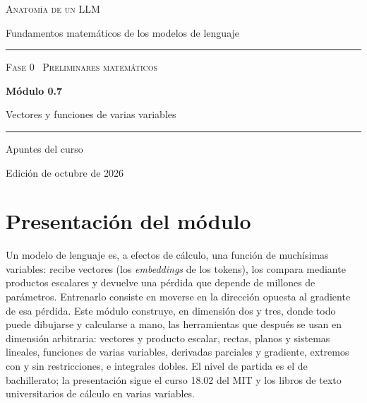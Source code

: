 \documentclass[11pt,a4paper,twoside,openany]{book}
\begin{document}
\frontmatter
\begin{titlepage}
\centering
\vspace*{2.5cm}
{\large\scshape Anatomía de un LLM}\par
\vspace{0.4cm}
{\normalsize Fundamentos matemáticos de los modelos de lenguaje}\par
\vspace{2.2cm}
\rule{\textwidth}{0.8pt}\par\vspace{0.5cm}
{\small\scshape Fase 0 \textperiodcentered\ Preliminares matemáticos}\par\vspace{0.3cm}
{\Huge\bfseries Módulo 0.7\par}\vspace{0.3cm}
{\LARGE Vectores y funciones de varias variables\par}
\vspace{0.5cm}\rule{\textwidth}{0.4pt}\par
\vspace{1.6cm}
{\large Apuntes del curso}\par
\vfill
{\small Edición de octubre de 2026}\par
\end{titlepage}

\chapter*{Presentación del módulo}

Un modelo de lenguaje es, a efectos de cálculo, una función de muchísimas variables: recibe vectores (los \emph{embeddings} de los tokens), los compara mediante productos escalares y devuelve una pérdida que depende de millones de parámetros. Entrenarlo consiste en moverse en la dirección opuesta al gradiente de esa pérdida. Este módulo construye, en dimensión dos y tres, donde todo puede dibujarse y calcularse a mano, las herramientas que después se usan en dimensión arbitraria: vectores y producto escalar, rectas, planos y sistemas lineales, funciones de varias variables, derivadas parciales y gradiente, extremos con y sin restricciones, e integrales dobles. El nivel de partida es el de bachillerato; la presentación sigue el curso 18.02 del MIT y los libros de texto universitarios de cálculo en varias variables.
\end{document}
